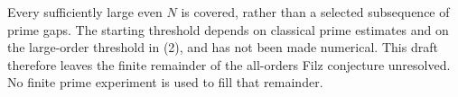 \begin{remark}
Every sufficiently large even \(N\) is covered, rather than
a selected subsequence of prime gaps.
The starting threshold depends on classical prime estimates
and on the large-order threshold in (2), and has not been
made numerical. This draft therefore leaves the finite
remainder of the all-orders Filz conjecture unresolved.
No finite prime experiment is used to fill that remainder.
\end{remark}
